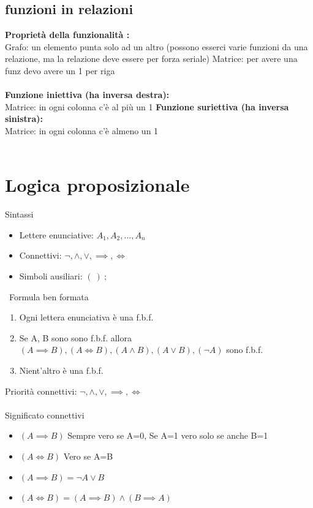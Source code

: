 \documentclass{article}
\begin{document}
\begin{multicols*}{3}
 		\subsection{funzioni in relazioni}
 		\textbf{Proprietà della funzionalità :}\\
 		Grafo: un elemento punta solo ad un altro (possono esserci varie funzioni da una relazione, ma la relazione deve essere per forza seriale)
 		Matrice: per avere una funz devo avere un 1 per riga \\\\
 		\textbf{Funzione iniettiva (ha inversa destra):}\\
 		Matrice: in ogni colonna c'è al più un 1
 		\textbf{Funzione suriettiva (ha inversa sinistra):}\\
 		Matrice: in ogni colonna c'è almeno un 1\\\\
 		
 		
 		
 		
	 	\section{Logica proposizionale}
	 	
	 	{\large Sintassi}
	 	\begin{itemize}
	 		\setlength\itemsep{0.1mm}
	 		\item Lettere enunciative: \( A_1, A_2, ... , A_n\) 
	 		\item Connettivi: \(\neg, \land, \lor, \implies, \iff \)
	 		\item Simboli ausiliari: \( (\ )\ ; \)
	 	\end{itemize}
 		\
 		{\large Formula ben formata}
 		\begin{enumerate}
 			\item Ogni lettera enunciativa è una f.b.f.
 			\item Se A, B sono sono f.b.f. allora \( (A\implies B),(A \iff B) , (A \land B), (A\lor B), (\neg A) \) sono f.b.f.
 			\item Nient'altro è una f.b.f.
 		\end{enumerate}
 		
 		{\large Priorità connettivi: \(\neg, \land, \lor, \implies, \iff \)}\\\\
 		Significato connettivi
 		\begin{itemize}
 			\setlength\itemsep{0.1mm}
 			\item \( (A\implies B) \) Sempre vero se A=0, Se A=1 vero solo se anche B=1
 			\item \( (A\iff B) \) Vero se A=B
 			\item  \( (A\implies B) = \neg A \lor B\)
 			\item \( (A\iff B) = (A\implies B)\land(B\implies A) \) 
 		\end{itemize}

\end{multicols*}
\end{document}
